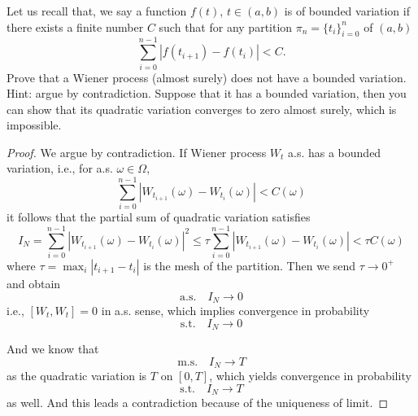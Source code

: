 \newcommand{\var}{\mathrm{Var}}
\newcommand{\cov}{\mathrm{Cov}}

    \problem
    \begin{question}
        Let us recall that, we say a function $f(t)$, $t\in(a,b)$ is
        of bounded variation if there exists a finite number $C$ such
        that for any partition $\pi_n=\{t_i\}^{n}_{i=0}$ of $(a,b)$
        \[\sum^{n-1}_{i=0}|f(t_{i+1})-f(t_i)|<C.\]
        Prove that a Wiener process (almost surely) does not have a
        bounded variation.  Hint: argue by contradiction.  Suppose
        that it has a bounded variation, then you can show that its
        quadratic variation converges to zero almost surely, which is impossible.
    \end{question}
    \begin{proof}
        We argue by contradiction. If Wiener process
        $W_t$ a.s. has a bounded variation, i.e.,
        for a.s. $\omega\in\Omega$,
        \[\sum_{i=0}^{n-1}
        |W_{t_{i+1}}(\omega)-W_{t_i}(\omega)|<C(\omega)\]
        it follows that the partial sum of quadratic variation
        satisfies
        \[I_N=\sum_{i=0}^{n-1}
        |W_{t_{i+1}}(\omega)-W_{t_i}(\omega)|^2\leq
        \tau\sum_{i=0}^{n-1}|W_{t_{i+1}}(\omega)-W_{t_i}(\omega)|
        <\tau C(\omega)\]
        where $\tau=\max_i|t_{i+1}-t_i|$ is the mesh of the
        partition.
        Then we send $\tau\to 0^+$ and obtain
        \[\text{a.s.}\quad I_N\to 0\]
        i.e., $[W_t,W_t]=0$ in a.s. sense, which implies
        convergence in probability
        \[\text{s.t.}\quad I_N\to 0\]
        
        And we know that
        \[\text{m.s.}\quad I_N\to T\]
        as the quadratic variation is $T$ on $[0,T]$,
        which yields convergence in probability
        \[\text{s.t.}\quad I_N\to T\]
        as well. And this leads a contradiction because of the
        uniqueness of limit.
    \end{proof}

    \skipproblem

